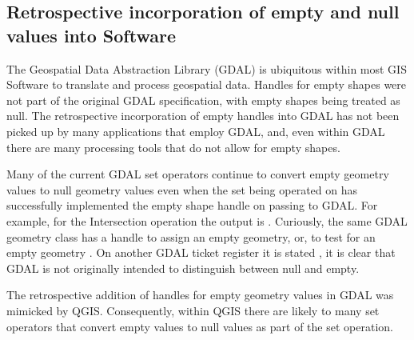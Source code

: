 \documentclass[letterpaper,10pt,english]{sphinxmanual}
\begin{document}
\subsection{Retrospective incorporation of empty and null values into Software}
\label{\detokenize{concept:retrospective-incorporation-of-empty-and-null-values-into-software}}
The Geospatial Data Abstraction Library (GDAL) is ubiquitous within most GIS Software to translate and process geospatial data.  Handles for empty shapes were not part of the original GDAL specification, with empty shapes being treated as null.   The retrospective incorporation of empty handles into GDAL has not been picked up by many applications that employ GDAL, and, even within GDAL there are many processing tools that do not allow for empty shapes.

Many of the current GDAL set operators continue to convert empty geometry values to null geometry values even when the set being operated on has successfully implemented the empty shape handle on passing to GDAL.  For example, for the Intersection operation the output is  .  Curiously, the same GDAL geometry class has a handle to assign an empty geometry, or, to test for an empty geometry .  On another GDAL ticket register it is stated  , it is clear that GDAL is not originally intended to distinguish between null and empty.

The retrospective addition of handles for empty geometry values in GDAL was mimicked by QGIS.  Consequently, within QGIS there are likely to many set operators that convert empty values to null values as part of the set operation.
\end{document}
